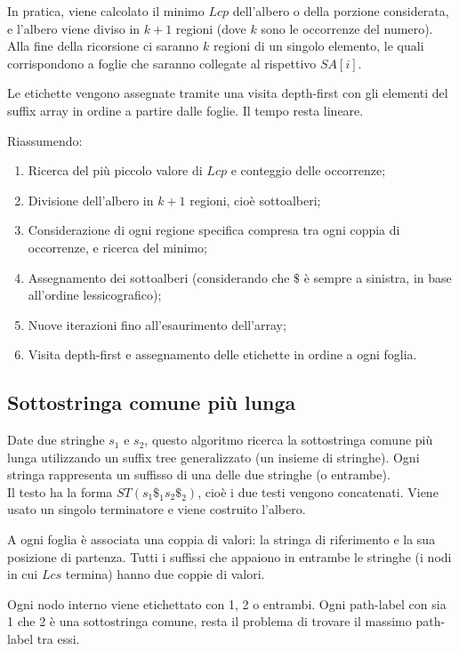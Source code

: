 In pratica, viene calcolato il minimo $Lcp$ dell'albero o della porzione considerata, e l'albero viene diviso in $k + 1$ regioni (dove $k$ sono le occorrenze del numero). Alla fine della ricorsione ci saranno $k$ regioni di un singolo elemento, le quali corrispondono a foglie che saranno collegate al rispettivo $SA[i]$.

Le etichette vengono assegnate tramite una visita depth-first con gli elementi del suffix array in ordine a partire dalle foglie. Il tempo resta lineare. 

Riassumendo:
\begin{enumerate}
	\item Ricerca del più piccolo valore di $Lcp$ e conteggio delle occorrenze;
	\item Divisione dell'albero in $k + 1$ regioni, cioè sottoalberi;
	\item Considerazione di ogni regione specifica compresa tra ogni coppia di occorrenze, e ricerca del minimo;
	\item Assegnamento dei sottoalberi (considerando che $\$$ è sempre a sinistra, in base all'ordine lessicografico);
	\item Nuove iterazioni fino all'esaurimento dell'array;
	\item Visita depth-first e assegnamento delle etichette in ordine a ogni foglia.
\end{enumerate}

\subsection{Sottostringa comune più lunga}
Date due stringhe $s_1$ e $s_2$, questo algoritmo ricerca la sottostringa comune più lunga utilizzando un suffix tree generalizzato (un insieme di stringhe). Ogni stringa rappresenta un suffisso di una delle due stringhe (o entrambe). \\
Il testo ha la forma $ST(s_1\$_1s_2\$_2)$, cioè i due testi vengono concatenati. Viene usato un singolo terminatore e viene costruito l'albero.

A ogni foglia è associata una coppia di valori: la stringa di riferimento e la sua posizione di partenza. Tutti i suffissi che appaiono in entrambe le stringhe (i nodi in cui $Lcs$ termina) hanno due coppie di valori. 

Ogni nodo interno viene etichettato con 1, 2 o entrambi. Ogni path-label con sia 1 che 2 è una sottostringa comune, resta il problema di trovare il massimo path-label tra essi. 

